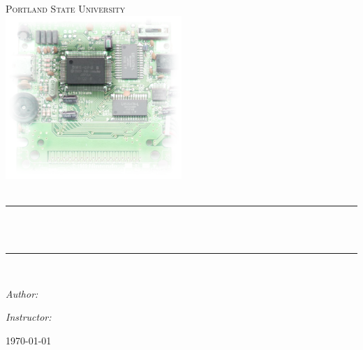 \begin{titlepage}
 \begin{center}
 \newcommand{\HRule}{\rule{\linewidth}{0.5mm}}

\textsc{\LARGE Portland State University}\\[1.5cm]

\includegraphics[width=0.5\textwidth]{../latex_common/logo}~\\[1cm]

\textsc{\Large \SUBJECT}\\[0.5cm]

\HRule \\[0.4cm]
{ \huge \bfseries \TOPIC}\\[0.4cm]

\HRule \\[1.5cm]

\begin{minipage}{0.4\textwidth}
\begin{flushleft} \large
\emph{Author:}\\
\AUTHOR
\end{flushleft}
\end{minipage}
\begin{minipage}{0.4\textwidth}
\begin{flushright} \large
\emph{Instructor:} \\
\INSTRUCTOR
\end{flushright}
\end{minipage}

\vfill

{\large \today}

\end{center}

\end{titlepage}

